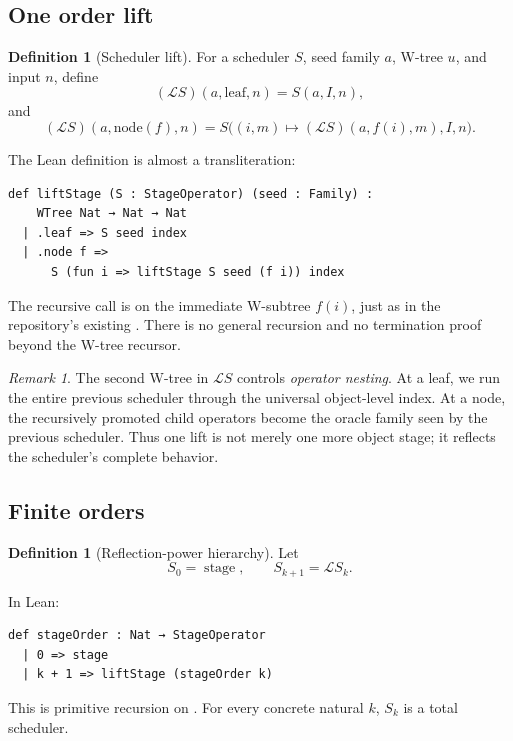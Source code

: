 \documentclass[11pt]{article}
\theoremstyle{definition}
\newtheorem{definition}[theorem]{Definition}
\theoremstyle{remark}
\newtheorem{remark}[theorem]{Remark}
\newcommand{\Lift}{\mathcal L}
\newcommand{\Idx}{I}
\newcommand{\lean}[1]{\texttt{\detokenize{#1}}}
\begin{document}
\subsection{One order lift}

\begin{definition}[Scheduler lift]\label{def:lift}
For a scheduler \(S\), seed family \(a\), W-tree \(u\), and input \(n\), define
\[
 (\Lift S)(a,\mathrm{leaf},n)=S(a,\Idx,n),
\]
and
\[
 (\Lift S)(a,\mathrm{node}(f),n)
 =S\bigl((i,m)\mapsto(\Lift S)(a,f(i),m),\Idx,n\bigr).
\]
\end{definition}

The Lean definition is almost a transliteration:
\begin{lstlisting}
def liftStage (S : StageOperator) (seed : Family) :
    WTree Nat → Nat → Nat
  | .leaf => S seed index
  | .node f =>
      S (fun i => liftStage S seed (f i)) index
\end{lstlisting}
The recursive call is on the immediate W-subtree \(f(i)\), just as in the
repository's existing \lean{stage}.  There is no general recursion and no
termination proof beyond the W-tree recursor.

\begin{remark}
The second W-tree in \(\Lift S\) controls \emph{operator nesting}.  At a leaf,
we run the entire previous scheduler through the universal object-level index.
At a node, the recursively promoted child operators become the oracle family
seen by the previous scheduler.  Thus one lift is not merely one more object
stage; it reflects the scheduler's complete behavior.
\end{remark}

\subsection{Finite orders}

\begin{definition}[Reflection-power hierarchy]\label{def:orders}
Let
\[
 S_0=\operatorname{stage},\qquad S_{k+1}=\Lift S_k.
\]
\end{definition}
In Lean:
\begin{lstlisting}
def stageOrder : Nat → StageOperator
  | 0 => stage
  | k + 1 => liftStage (stageOrder k)
\end{lstlisting}
This is primitive recursion on \lean{Nat}.  For every concrete natural \(k\),
\(S_k\) is a total scheduler.

\end{document}
